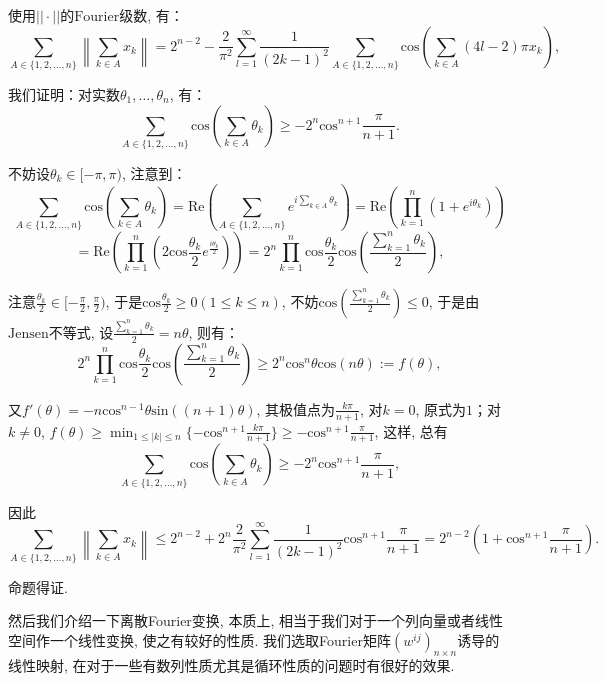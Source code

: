 \documentclass[lang=cn,12pt,thmcnt=section]{elegantbook}
\begin{document}
\begin{solution}
使用$||\cdot||$的$\mathrm{Fourier}$级数, 有：
\[
\sum_{ A\in\{1,2,\dots{},n\}}\left\lVert\sum_{k\in A}x_k\right\rVert=2^{n-2}-\frac{2}{\pi^2}\sum_{l=1}^\infty\frac{1}{(2k-1)^2}\sum_{ A\in\{1,2,\dots{},n\}}\mathrm{cos}\left(\sum_{k\in A}(4l-2)\pi x_k\right),
\]

我们证明：对实数$\theta_1,\dots{},\theta_n$, 有：
\[
\sum_{ A\in\{1,2,\dots{},n\}}\mathrm{cos}\left(\sum_{k\in A}\theta_k\right)\ge -2^n\mathrm{cos}^{n+1}\frac{\pi}{n+1}.
\]

不妨设$\theta_{k}\in [-\pi,\pi)$, 注意到：
\[
\sum_{ A\in\{1,2,\dots{},n\}}\mathrm{cos}\left(\sum_{k\in A}\theta_k\right)=\mathrm{Re}\left(\sum_{ A\in\{1,2,\dots{},n\}}e^{i\sum_{k\in A}\theta_k}\right)=\mathrm{Re}\left(\prod_{k=1}^n (1+e^{i\theta_k})\right)
\]
\[
=\mathrm{Re}\left(\prod_{k=1}^n (2\mathrm{cos}\frac{\theta_k}{2}e^{\frac{i\theta_k}{2}})\right)=2^n\prod_{k=1}^n \mathrm{cos}\frac{\theta_k}{2}\mathrm{cos}\left(\frac{\sum_{k=1}^n \theta_k}{2}\right),
\]

注意$\frac{\theta_k}{2}\in[-\frac{\pi}{2},\frac{\pi}{2})$, 于是$\mathrm{cos}\frac{\theta_k}{2}\ge 0(1\le k\le n)$, 不妨$\mathrm{cos}\left(\frac{\sum_{k=1}^n \theta_k}{2}\right)\le 0$, 于是由$\mathrm{Jensen}$不等式, 设$\frac{\sum_{k=1}^n \theta_k}{2}=n\theta$, 则有：
\[
2^n\prod_{k=1}^n \mathrm{cos}\frac{\theta_k}{2}\mathrm{cos}\left(\frac{\sum_{k=1}^n \theta_k}{2}\right)\ge 2^n\mathrm{cos}^n\theta\mathrm{cos}(n\theta):=f(\theta),
\]

又$f'(\theta)=-n\mathrm{cos}^{n-1}\theta\mathrm{sin}((n+1)\theta)$, 其极值点为$\frac{k\pi}{n+1}$, 对$k=0$, 原式为$1$；对$k\ne 0$, $f(\theta)\ge \min_{1\le |k|\le n}\{-\mathrm{cos}^{n+1}\frac{k\pi}{n+1}\}\ge -\mathrm{cos}^{n+1}\frac{\pi}{n+1}$, 这样, 总有
\[
\sum_{ A\in\{1,2,\dots{},n\}}\mathrm{cos}\left(\sum_{k\in A}\theta_k\right)\ge -2^n\mathrm{cos}^{n+1}\frac{\pi}{n+1},
\]

因此
\[
\sum_{ A\in\{1,2,\dots{},n\}}\left\lVert\sum_{k\in A}x_k\right\rVert\le 2^{n-2}+2^n\frac{2}{\pi^2}\sum_{l=1}^\infty\frac{1}{(2k-1)^2}\mathrm{cos}^{n+1}\frac{\pi}{n+1}=2^{n-2}\left(1+\mathrm{cos}^{n+1}\frac{\pi}{n+1}\right).
\]

命题得证.
\end{solution}

然后我们介绍一下离散Fourier变换, 本质上, 相当于我们对于一个列向量或者线性空间作一个线性变换, 使之有较好的性质. 我们选取Fourier矩阵$(w^{ij})_{n\times n}$诱导的线性映射, 在对于一些有数列性质尤其是循环性质的问题时有很好的效果. 
\end{document}
